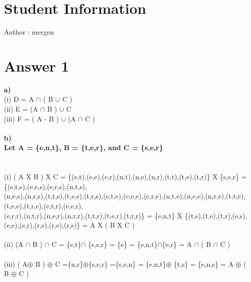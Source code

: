 \documentclass[11pt]{article}
\begin{document}
\section*{Student Information } 
Author : mergen\\


\section*{Answer 1}
\textbf{a)}\\
(i)\hspace{0.15cm} D = A $\cap$ ( B $\cup$ C )\\
(ii)\hspace{0.05cm} E = (A $\cap$ B ) $\cup$ C\\
(iii) F = ( A - B ) $\cup$ (A $\cap$ C )\\ 
\\
\textbf{b)}\\
\textbf{Let A = \{e,n,t\}, B = \{t,e,r\}, and C = \{s,e,r\}} \\
\\
\\
(i) ( A X B ) X C = \{(e,t),(e,e),(e,r),(n,t),(n,e),(n,r),(t,t),(t,e),(t,r)\} X \{s,e,r\} = \{(e,t,s),(e,e,s),(e,r,s),(n,t,s),\\ 
\hspace{1cm}(n,e,s),(n,r,s),(t,t,s),(t,e,s),(t,r,s),(e,t,e),(e,e,e),(e,r,e),(n,t,e),(n,e,e),(n,r,e),(t,t,e),(t,e,e),(t,r,e),(e,t,r),(e,e,r),\\
(e,r,r),(n,t,r),(n,e,r),(n,r,r),(t,t,r),(t,e,r),(t,r,r)\} = \{e,n,t\} X \{(t,s),(t,e),(t,r),(e,s),(e,e),(e,r),(r,s),(r,e),(r,s)\} = A X ( B X C )\\
\\
(ii) (A $\cap$ B ) $\cap$ C = \{e,t\}$\cap$ \{s,e,r\} = \{e\} = \{e,n,t\}$\cap$\{e,r\} = A $\cap$ ( B $\cap$ C ) \\
\\
(iii) ( A$\oplus$ B ) $\oplus$ C =\{n,r\}$\oplus$\{s,e,r\} =\{s,e,n\} = \{e,n,t\}$\oplus$ \{t,s\} = \{e,n,s\} = A $\oplus$ ( B $\oplus$ C ) \\
\end{document}
